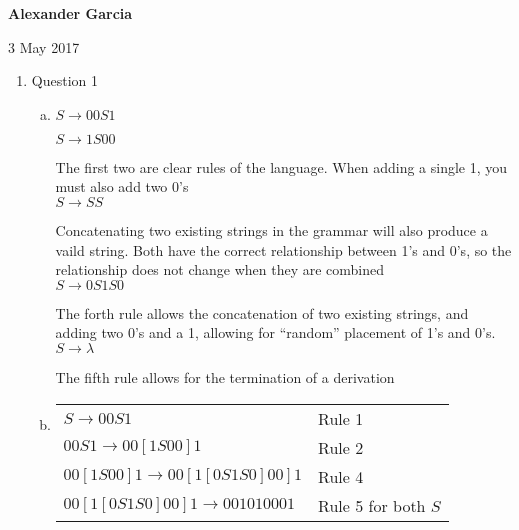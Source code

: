 \documentclass[11pt]{article}
\begin{document}
\textbf{Alexander Garcia}

3 May 2017 \\

	\begin{enumerate}

			\item Question 1

				\begin{enumerate}[(a)]

					\item

						$S \rightarrow 00S1$

						$S \rightarrow 1S00$

						The first two are clear rules of the language. When adding a single 1,
						you must also add two 0's \\

						$S \rightarrow SS$

						Concatenating two existing strings in the grammar will also produce a vaild string.
						Both have the correct relationship between 1's and 0's, so the relationship does not
						change when they are combined \\


						$S \rightarrow 0S1S0$

						The forth rule allows the concatenation of two existing strings, and adding two 0's and a 1,
						allowing for ``random'' placement of 1's and 0's. \\


						$S \rightarrow \lambda$

						The fifth rule allows for the termination of a derivation \\

					\item 	\begin{tabular}{ll}

						$S \rightarrow 00S1$ & Rule 1 \\

						$00S1 \rightarrow 00[1S00]1$ & Rule 2 \\

						$00[1S00]1 \rightarrow 00[1[0S1S0]00]1$ & Rule 4 \\

						$00[1[0S1S0]00]1 \rightarrow 001010001$ & Rule 5 for both $S$ \\

					\end{tabular}

				\end{enumerate}


\end{enumerate}
\end{document}

